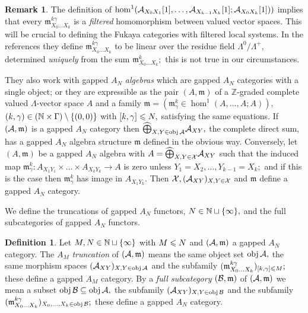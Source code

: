 \documentclass{article}
\theoremstyle{plain}%
\theoremstyle{definition}
\newtheorem{dfn}[thm]{Definition}
\newtheorem{rem}[thm]{Remark}
\numberwithin{equation}{section}
\numberwithin{figure}{section}
\def\wh{\widehat}
\def\l{\label}
\def\fm{{\mathfrak m}}
\def\le{\leqslant\nobreak}
\def\cA{{\mathbin{\cal A}}}
\def\cB{{\mathbin{\cal B}}}
\def\cX{{\mathbin{\cal X}}}
\def\Z{{\mathbin{\mathbb Z}}}
\def\ga{\gamma}
\def\La{\Lambda}
\def\Ga{\Gamma}
\def\-{\setminus}
\def\bop{\bigoplus}
\def\iy{\infty}
\def\sb{\subseteq}
\begin{document}
\begin{rem}\l{rem: difference from FOOO}
The definition of $\hom^1(\cA_{X_0X_1}[1],\dots,\cA_{X_{k-1}X_k}[1];\cA_{X_0X_k}[1]))$ implies that every $\fm^{k\ga}_{X_0\dots X_k}$ is a {\it filtered} homomorphism between valued vector spaces.
This will be crucial to defining the Fukaya categories with filtered local systems.
In the references \cite{AJ,FOOO} they define $\fm^{k\ga}_{X_0\dots X_k}$ to be linear over the residue field $\La^0/\La^+,$ determined {\it uniquely} from the sum $\fm^k_{X_0\dots X_k};$ this is not true in our circumstances.

They also work with gapped $A_N$ {\it algebras} which are gapped $A_N$ categories with a single object; or they are expressible as the pair $(A,\fm)$ of a $\Z$-graded complete valued $\La$-vector space $A$ and a family $\fm=(\fm^k_\ga\in\hom^1(A,\dots,A;A)),$ $(k,\ga)\in(\N\times\Ga)\-\{(0,0)\}$ with $[k,\ga]\le N,$ satisfying the same equations. 
If $(\cA,\fm)$ is a gapped $A_N$ category then $\wh\bop_{X,Y\in\obj\cA}\cA_{XY},$ the complete direct sum, has a gapped $A_N$ algebra structure $\fm$ defined in the obvious way. Conversely, let $(A,\fm)$ be a gapped $A_N$ algebra with $A=\wh\bop_{X,Y\in\cX}\cA_{XY}$ such that the induced map $\fm^k_\ga:A_{X_1Y_1}\times\dots\times A_{X_kY_k}\to A$ is zero unless $Y_1=X_2,\dots,Y_{k-1}=X_k;$ and if this is the case then $\fm^k_\ga$ has image in $A_{X_1Y_k}.$ Then $\cX,(\cA_{XY})_{X,Y\in\cX}$ and $\fm$ define a gapped $A_N$ category.
\end{rem}

We define the truncations of gapped $A_N$ functors, $N\in\N\sqcup\{\iy\},$ and the full subcategories of gapped $A_N$ functors.
\begin{dfn}
Let $M,N\in\N\sqcup\{\iy\}$ with $M\le N$ and $(\cA,\fm)$ a gapped $A_N$ category.
The $A_M$ {\it truncation} of $(\cA,\fm)$ means the same object set $\obj\cA,$ the same morphism spaces $(\cA_{XY})_{X,Y\in\obj\cA}$ and the subfamily $(\fm^{k\ga}_{X_0\dots X_k})_{[k,\ga]\le M};$ these define a gapped $A_M$ category. 
By a {\it full subcategory} $(\cB,\fm)$ of $(\cA,\fm)$ we mean a subset $\obj\cB\sb\obj\cA,$ the subfamily $(\cA_{XY})_{X,Y\in\obj\cB}$ and the subfamily $(\fm^{k\ga}_{X_0\dots X_k})_{X_0,\dots,X_k\in\obj\cB};$ these define a gapped $A_N$ category.
\end{dfn}
\end{document}
